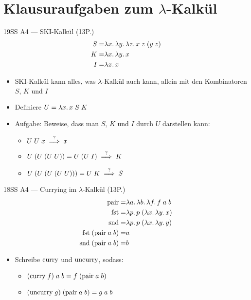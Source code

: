 \documentclass{beamer}
\begin{document}
\section{Klausuraufgaben zum $\lambda$-Kalkül}

\begin{frame}{19SS A4 --- SKI-Kalkül (13P.)}
	\begin{eqnarray*}
          S =& \lambda x.\, \lambda y.\, \lambda z.\, x\;z\;(y\;z) \\
		K =& \lambda x.\, \lambda y.\, x \\
		I =& \lambda x.\, x
	\end{eqnarray*}

	\begin{itemize}
		\item SKI-Kalkül kann alles, was $\lambda$-Kalkül auch kann, allein mit den Kombinatoren $S$, $K$ und $I$
		\item Definiere $U = \lambda x.\, x\;S\;K$
		\item Aufgabe: Beweise, dass man $S$, $K$ und $I$ durch $U$ darstellen kann:
		\pause
		\begin{itemize}
			\item $U\;U\;x \stackrel{?}{\implies} x$
                        \item $U\;(U\;(U\;U)) = U\;(U\;I) \stackrel{?}{\implies} K$
                        \item $U\;(U\;(U\;(U\;U))) = U\;K \stackrel{?}{\implies} S$
		\end{itemize}
	\end{itemize}
\end{frame}

\begin{frame}{18SS A4 --- Currying im $\lambda$-Kalkül (13P.)}
	\begin{eqnarray*}
		\text{pair} =& \lambda a.\, \lambda b.\, \lambda f.\, f\;a\;b \\
                \text{fst}  =& \lambda p.\, p\;(\lambda x.\, \lambda y.\, x) \\
                \text{snd}  =& \lambda p.\, p\;(\lambda x.\, \lambda y.\, y) \\
                \text{fst}\;(\text{pair}\;a\;b) =& a \\
                \text{snd}\;(\text{pair}\;a\;b) =& b \\
	\end{eqnarray*}

	\begin{itemize}
		\item Schreibe $\text{curry}$ und $\text{uncurry}$, sodass:
		\begin{itemize}
                  \item $\appp{(\app{\ccurry}{f})}{a}{b} = \appp{f}{(\appp{\cpair}{a}{b})}$
                  \item $(\text{uncurry}\;g)\;(\text{pair}\;a\;b) = g\;a\;b$
		\end{itemize}
	\end{itemize}
\end{frame}
\end{document}
